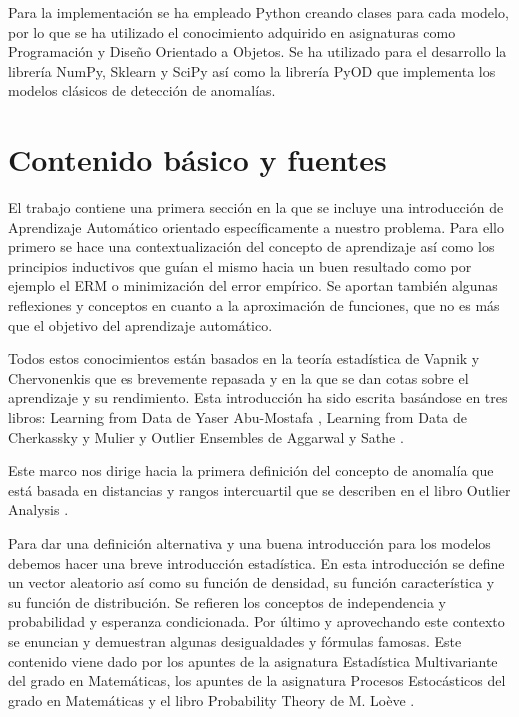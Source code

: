 Para la implementación se ha empleado Python creando clases para cada modelo, por lo que se ha utilizado el conocimiento adquirido en asignaturas como Programación y Diseño Orientado a Objetos. Se ha utilizado para el desarrollo la librería NumPy, Sklearn y SciPy así como la librería PyOD que implementa los modelos clásicos de detección de anomalías. 

\section{Contenido básico y fuentes}

El trabajo contiene una primera sección en la que se incluye una introducción de Aprendizaje Automático orientado específicamente a nuestro problema. Para ello primero se hace una contextualización del concepto de aprendizaje así como los principios inductivos que guían el mismo hacia un buen resultado como por ejemplo el ERM o minimización del error empírico. Se aportan también algunas reflexiones y conceptos en cuanto a la aproximación de funciones, que no es más que el objetivo del aprendizaje automático. 

Todos estos conocimientos están basados en la teoría estadística de Vapnik y Chervonenkis que es brevemente repasada y en la que se dan cotas sobre el aprendizaje y su rendimiento. Esta introducción ha sido escrita basándose en tres libros: Learning from Data de Yaser Abu-Mostafa \cite{yaser_learning_2012}, Learning from Data de Cherkassky y Mulier \cite{cherkassky_learning_2007}  y Outlier Ensembles de Aggarwal y Sathe \cite{aggarwal_outlier_2017}.

Este marco nos dirige hacia la primera definición del concepto de anomalía que está basada en distancias y rangos intercuartil que se describen en el libro Outlier Analysis \cite{aggarwal_outlier_2017-1}.

Para dar una definición alternativa y una buena introducción para los modelos debemos hacer una breve introducción estadística. En esta introducción se define un vector aleatorio así como su función de densidad, su función característica y su función de distribución. Se refieren los conceptos de independencia y probabilidad y esperanza condicionada. Por último y aprovechando este contexto se enuncian y demuestran algunas desigualdades y fórmulas famosas. Este contenido viene dado por los apuntes de la asignatura Estadística Multivariante del grado en Matemáticas, los apuntes de la asignatura Procesos Estocásticos del grado en Matemáticas y el libro Probability Theory de M. Loève \cite{m._loeve_probability_1977}.

